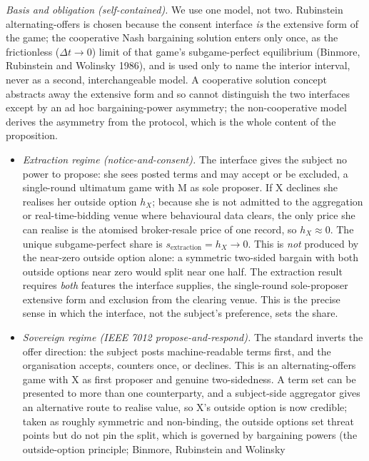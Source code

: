 \documentclass[
  11pt,
]{article}
\begin{document}
\emph{Basis and obligation (self-contained).} We use one model, not two.
Rubinstein alternating-offers is chosen because the consent interface
\emph{is} the extensive form of the game; the cooperative Nash
bargaining solution enters only once, as the frictionless
(\(\Delta t \to 0\)) limit of that game's subgame-perfect equilibrium
(Binmore, Rubinstein and Wolinsky 1986), and is used only to name the
interior interval, never as a second, interchangeable model. A
cooperative solution concept abstracts away the extensive form and so
cannot distinguish the two interfaces except by an ad hoc
bargaining-power asymmetry; the non-cooperative model derives the
asymmetry from the protocol, which is the whole content of the
proposition.

\begin{itemize}
\item
  \emph{Extraction regime (notice-and-consent).} The interface gives the
  subject no power to propose: she sees posted terms and may accept or
  be excluded, a single-round ultimatum game with M as sole proposer. If
  X declines she realises her outside option \(h_X\); because she is not
  admitted to the aggregation or real-time-bidding venue where
  behavioural data clears, the only price she can realise is the
  atomised broker-resale price of one record, so \(h_X \approx 0\). The
  unique subgame-perfect share is \(s_{\text{extraction}} = h_X \to 0\).
  This is \emph{not} produced by the near-zero outside option alone: a
  symmetric two-sided bargain with both outside options near zero would
  split near one half. The extraction result requires \emph{both}
  features the interface supplies, the single-round sole-proposer
  extensive form and exclusion from the clearing venue. This is the
  precise sense in which the interface, not the subject's preference,
  sets the share.
\item
  \emph{Sovereign regime (IEEE 7012 propose-and-respond).} The standard
  inverts the offer direction: the subject posts machine-readable terms
  first, and the organisation accepts, counters once, or declines. This
  is an alternating-offers game with X as first proposer and genuine
  two-sidedness. A term set can be presented to more than one
  counterparty, and a subject-side aggregator gives an alternative route
  to realise value, so X's outside option is now credible; taken as
  roughly symmetric and non-binding, the outside options set threat
  points but do not pin the split, which is governed by bargaining
  powers (the outside-option principle; Binmore, Rubinstein and Wolinsky

\end{itemize}
\end{document}
